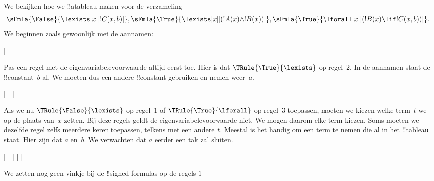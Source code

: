 \documentclass[../../../include/open-logic-section]{subfiles}
\begin{document}
\begin{ex}
We bekijken hoe we !!a{tableau} maken voor de verzameling
\[
\sFmla{\False}{\lexists[x][!C(x,b)]},
\sFmla{\True}{\lexists[x][(!A(x) \land !B(x))]},
\sFmla{\True}{\lforall[x][(!B(x) \lif !C(x,b))]}.
\]
We beginnen zoals gewoonlijk met de aannamen:
\begin{oltableau}
  [\sFmla{\False}{\lexists[x][\formula{C}(x,b)]}, just=\TAss
    [\sFmla{\True}{\lexists[x][(\formula{A}(x) \land \formula{B}(x))]},
      just=\TAss
      [\sFmla{\True}{\lforall[x][(\formula{B}(x) \lif \formula{C}(x,b))]},
        just=\TAss]
    ]
  ]
\end{oltableau}
Pas een regel met de eigenvariabelevoorwaarde altijd eerst toe. Hier is
dat $\TRule{\True}{\lexists}$ op regel~$2$. In de aannamen staat de
!!{constant}~$b$ al. We moeten dus een andere !!{constant} gebruiken en
nemen weer~$a$.
\begin{oltableau}
  [\sFmla{\False}{\lexists[x][\formula{C}(x,b)]}, just=\TAss
    [\sFmla{\True}{\lexists[x][(\formula{A}(x) \land \formula{B}(x))]},
      just=\TAss, checked
      [\sFmla{\True}{\lforall[x][(\formula{B}(x) \lif \formula{C}(x,b))]},
        just=\TAss
        [\sFmla{\True}{\formula{A}(a) \land \formula{B}(a)},
          just={\TRule{\True}{\lexists}[2]}]
      ]
    ]
  ]
\end{oltableau}
Als we nu $\TRule{\False}{\lexists}$ op regel~$1$ of
$\TRule{\True}{\lforall}$ op regel~$3$ toepassen, moeten we kiezen welke
term~$t$ we op de plaats van~$x$ zetten. Bij deze regels geldt de
eigenvariabelevoorwaarde niet. We mogen daarom elke term kiezen. Soms
moeten we dezelfde regel zelfs meerdere keren toepassen, telkens met
een andere~$t$. Meestal is het handig om een term te nemen die al in het
!!{tableau} staat. Hier zijn dat $a$ en~$b$. We verwachten dat $a$
eerder een tak zal sluiten.
\begin{oltableau}
  [\sFmla{\False}{\lexists[x][\formula{C}(x,b)]}, just=\TAss
    [\sFmla{\True}{\lexists[x][(\formula{A}(x) \land \formula{B}(x))]},
      just=\TAss, checked
      [\sFmla{\True}{\lforall[x][(\formula{B}(x) \lif \formula{C}(x,b))]}, just=\TAss
        [\sFmla{\True}{\formula{A}(a) \land \formula{B}(a)}, just={\TRule{\True}{\lexists}[2]}
          [\sFmla{\False}{\formula{C}(a,b)}, just={\TRule{\False}{\lexists}[1]}
            [\sFmla{\True}{\formula{B}(a) \lif \formula{C}(a,b)},
              just={\TRule{\True}{\lforall}[3]}
            ]
          ]
        ]
      ]
    ]
  ]
\end{oltableau}
We zetten nog geen vinkje bij de !!{signed formula}s op de regels $1$

\end{ex}
\end{document}
